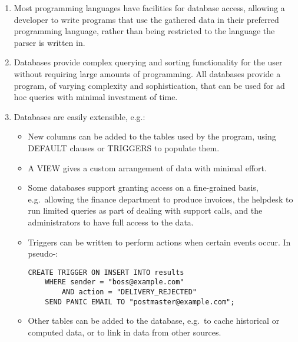 \begin{enumerate}

    \item Most programming languages have facilities for database access,
        allowing a developer to write programs that use the gathered data
        in their preferred programming language, rather than being
        restricted to the language the parser is written in.

    \item Databases provide complex querying and sorting functionality for
        the user without requiring large amounts of programming.  All
        databases provide a program, of varying complexity and
        sophistication, that can be used for ad hoc queries with minimal
        investment of time.

    \item Databases are easily extensible, e.g.:

        \begin{itemize}

            \item New columns can be added to the tables used by the
                program, using DEFAULT clauses or TRIGGERS to populate
                them.

            \item A VIEW gives a custom arrangement of data with minimal
                effort.

            \item Some databases support granting access on a fine-grained
                basis, e.g.\ allowing the finance department to produce
                invoices, the helpdesk to run limited queries as part of
                dealing with support calls, and the administrators to have
                full access to the data.

            \item Triggers can be written to perform actions when certain
                events occur.  In pseudo-\@:

\begin{verbatim}
CREATE TRIGGER ON INSERT INTO results
    WHERE sender = "boss@example.com"
        AND action = "DELIVERY_REJECTED"
    SEND PANIC EMAIL TO "postmaster@example.com";
\end{verbatim}

            \item Other tables can be added to the database, e.g.\ to cache
                historical or computed data, or to link in data from other
                sources.


\end{itemize}
\end{enumerate}
